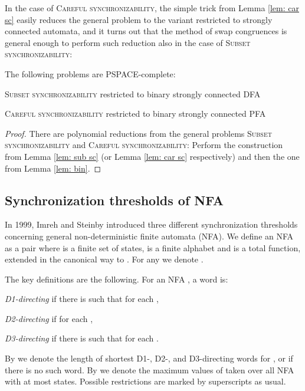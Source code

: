 \documentclass{ws-ijmpc}
\newcommand{\noun}[1]{\textsc{#1}}
\begin{document}
In the case of \noun{Careful synchronizability}, the simple trick
from Lemma \ref{lem: car sc} easily reduces the general problem to
the variant restricted to strongly connected automata, and it turns
out that the method of swap congruences is general enough to perform
such reduction also in the case of \noun{Subset synchronizability:}
\begin{theorem}
The following problems are PSPACE-complete:\end{theorem}
\begin{romanlist}
\item \noun{Subset synchronizability }restricted to binary strongly connected
DFA 
\item \noun{Careful synchronizability }restricted to binary strongly connected
PFA \end{romanlist}
\begin{proof}
There are polynomial reductions from the general problems \noun{Subset
synchronizability} and \noun{Careful synchronizability}: Perform the
construction from Lemma \ref{lem: sub sc} (or Lemma \ref{lem: car sc}
respectively) and then the one from Lemma \ref{lem: bin}.
\end{proof}

\subsection{Synchronization thresholds of NFA\label{sub:PFAvsNFA}}

In 1999, Imreh and Steinby \citep{IMR2} introduced three different
synchronization thresholds concerning general non-deterministic finite
automata (NFA). We define an NFA as a pair 
where  is a finite set of states,  is a finite alphabet and
 is a total function, extended
in the canonical way to .
For any  we denote .

The key definitions are the following. For an NFA , a word 
is:
\begin{itemlist}
\item \emph{D1-directing} if there is  such that 
for each ,
\item \emph{D2-directing }if 
for each ,
\item \emph{D3-directing }if there is  such that 
for each .
\end{itemlist}
By 
we denote the length of shortest D1-, D2-, and D3-directing words
for , or  if there is no such word. By 
we denote the maximum values of 
taken over all NFA  with at most  states. Possible restrictions
are marked by superscripts as usual.
\end{document}
